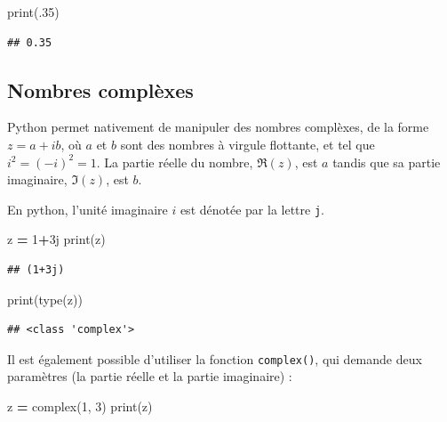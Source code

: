 \documentclass[
  12pt,
]{book}
\newenvironment{Shaded}{\begin{snugshade}}{\end{snugshade}}
\newcommand{\BuiltInTok}[1]{#1}
\newcommand{\DecValTok}[1]{\textcolor[rgb]{0.00,0.00,0.81}{#1}}
\newcommand{\FloatTok}[1]{\textcolor[rgb]{0.00,0.00,0.81}{#1}}
\newcommand{\NormalTok}[1]{#1}
\newcommand{\OperatorTok}[1]{\textcolor[rgb]{0.81,0.36,0.00}{\textbf{#1}}}
\newcommand{\OtherTok}[1]{\textcolor[rgb]{0.56,0.35,0.01}{#1}}
\numberwithin{equation}{section}
\numberwithin{countremarque}{section}
\begin{document}
\begin{Shaded}
\begin{Highlighting}[]
\BuiltInTok{print}\NormalTok{(}\FloatTok{.35}\NormalTok{)}
\end{Highlighting}
\end{Shaded}

\begin{lstlisting}
## 0.35
\end{lstlisting}

\subsection{Nombres complèxes}\label{nombres-compluxe8xes}

Python permet nativement de manipuler des nombres complèxes, de la forme \(z=a+ib\), où \(a\) et \(b\) sont des nombres à virgule flottante, et tel que \(i^2=(-i)^2=1\). La partie réelle du nombre, \(\mathfrak{R}(z)\), est \(a\) tandis que sa partie imaginaire, \(\mathfrak{I}(z)\), est \(b\).

En python, l'unité imaginaire \(i\) est dénotée par la lettre \texttt{j}.

\begin{Shaded}
\begin{Highlighting}[]
\NormalTok{z }\OperatorTok{=} \DecValTok{1}\OperatorTok{+}\OtherTok{3j}
\BuiltInTok{print}\NormalTok{(z)}
\end{Highlighting}
\end{Shaded}

\begin{lstlisting}
## (1+3j)
\end{lstlisting}

\begin{Shaded}
\begin{Highlighting}[]
\BuiltInTok{print}\NormalTok{(}\BuiltInTok{type}\NormalTok{(z))}
\end{Highlighting}
\end{Shaded}

\begin{lstlisting}
## <class 'complex'>
\end{lstlisting}

Il est également possible d'utiliser la fonction \texttt{complex()}, qui demande deux paramètres (la partie réelle et la partie imaginaire) :

\begin{Shaded}
\begin{Highlighting}[]
\NormalTok{z }\OperatorTok{=} \BuiltInTok{complex}\NormalTok{(}\DecValTok{1}\NormalTok{, }\DecValTok{3}\NormalTok{)}
\BuiltInTok{print}\NormalTok{(z)}
\end{Highlighting}
\end{Shaded}
\end{document}
